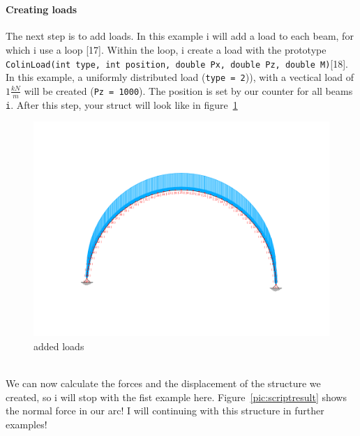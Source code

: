 \vspace{20pt}\\
\begin{minipage}[h]{\textwidth-8cm}
\paragraph{Creating loads} The next step is to add loads. In this example i will add a load to each beam, for which i use a loop [17]. Within the loop, i create a load with the prototype \texttt{ColinLoad(int type, int position, double Px, double Pz, double M)}[18]. In this example, a uniformly distributed load (\texttt{type = 2})), with a vectical load of $1\frac{kN}{m}$ will be created (\texttt{Pz = 1000}). The position is set by our counter for all beams \texttt{i}. After this step, your struct will look like in figure~\ref{pic:scriptload}
\end{minipage}
\hfill
\begin{minipage}[h]{8cm}
\begin{figure}[H]
\begin{center}
\includegraphics[width=\textwidth]{../pictures/scriptload.png}
\caption{added loads}
\label{pic:scriptload}
\end{center}
\end{figure}
\end{minipage}
\vspace{20pt}\\
We can now calculate the forces and the displacement of the structure we created, so i will stop with the fist example here. Figure~\ref{pic:scriptresult} shows the normal force in our arc! I will continuing with this structure in further examples! 
